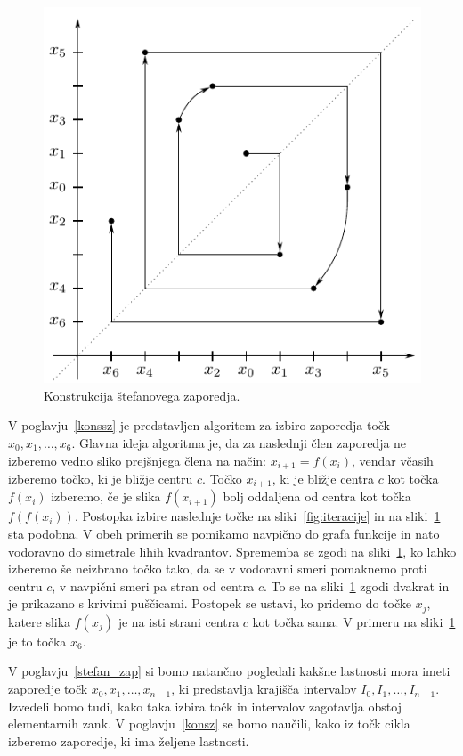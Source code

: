 \documentclass[mat2]{fmfdelo}
\begin{document}
\begin{primer}[9-cikel]
\begin{figure}[h]
  \centering
  \includegraphics{images/spiral.pdf}
  \caption[Primer vektorske slike.]{Konstrukcija štefanovega zaporedja.}
  \label{fig:spiral}
\end{figure}

V poglavju~\ref{konssz} je predstavljen algoritem za izbiro zaporedja točk $x_0, x_1, \dots, x_6$. Glavna ideja algoritma je, da za naslednji člen zaporedja ne izberemo vedno sliko prejšnjega člena na način: $x_{i+1} = f(x_i)$, vendar včasih izberemo točko, ki je bližje centru $c$. Točko $x_{i+1}$, ki je bližje centra $c$ kot točka $f(x_i)$ izberemo, če je slika $f(x_{i+1})$ bolj oddaljena od centra kot točka $f(f(x_i))$. Postopka izbire naslednje točke na sliki~\ref{fig:iteracije} in na sliki~\ref{fig:spiral} sta podobna. V obeh primerih se pomikamo navpično do grafa funkcije in nato vodoravno do simetrale lihih kvadrantov. Sprememba se zgodi na sliki~\ref{fig:spiral}, ko lahko izberemo še neizbrano točko tako, da se v vodoravni smeri pomaknemo proti centru $c$, v navpični smeri pa stran od centra $c$. To se na sliki~\ref{fig:spiral} zgodi dvakrat in je prikazano s krivimi puščicami. 
Postopek se ustavi, ko pridemo do točke $x_j$, katere slika $f(x_j)$ je na isti strani centra $c$ kot točka sama. V primeru na sliki~\ref{fig:spiral} je to točka $x_6$.

V poglavju~\ref{stefan_zap} si bomo natančno pogledali kakšne lastnosti mora imeti zaporedje točk $x_0, x_1, \dots, x_{n-1}$, ki predstavlja krajišča intervalov $I_0, I_1, \dots, I_{n-1}$. Izvedeli bomo tudi, kako taka izbira točk in intervalov zagotavlja obstoj elementarnih zank. V poglavju~\ref{konsz} se bomo naučili, kako iz točk cikla izberemo zaporedje, ki ima željene lastnosti. 

\end{primer}
\end{document}
